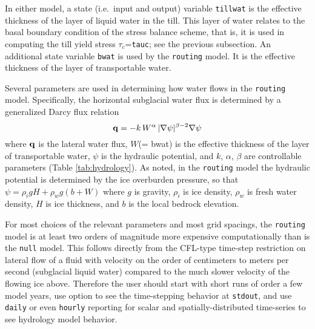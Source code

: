 In either model, a state (i.e.~input and output) variable \texttt{tillwat} is the effective thickness of the layer of liquid water in the till.  This layer of water relates to the basal boundary condition of the stress balance scheme, that is, it is used in computing the till yield stress $\tau_c$=\texttt{tauc}; see the previous subsection.  An additional state variable \texttt{bwat} is used by the  \texttt{routing} model.  It is the effective thickness of the layer of transportable water.

Several parameters are used in determining how water flows in the \texttt{routing} model.  Specifically, the horizontal subglacial water flux is determined by a generalized Darcy flux relation \cite{Clarke05,Schoofetal2012}
\begin{equation}  \label{eq:flux}
\mathbf{q} = - k\, W^\alpha\, |\nabla \psi|^{\beta-2} \nabla \psi
\end{equation}
where $\mathbf{q}$ is the lateral water flux, $W$(= bwat) is the effective thickness of the layer of transportable water, $\psi$ is the hydraulic potential, and $k$, $\alpha$, $\beta$ are controllable parameters (Table \ref{tab:hydrology}).  As noted, in the \texttt{routing} model the hydraulic potential is determined by the ice overburden pressure, so that $\psi = \rho_i g H + \rho_w g (b + W)$ where $g$ is gravity, $\rho_i$ is ice density, $\rho_w$ is fresh water density, $H$ is ice thickness, and $b$ is the local bedrock elevation.

For most choices of the relevant parameters and most grid spacings, the \texttt{routing} model is at least two orders of magnitude more expensive computationally than is the \texttt{null} model.  This follows directly from the CFL-type time-step restriction on lateral flow of a fluid with velocity on the order of centimeters to meters per second  (subglacial liquid water) compared to the much slower velocity of the flowing ice above.  Therefore the user should start with short runs of order a few model years, use option  to see the time-stepping behavior at \texttt{stdout}, and use \texttt{daily} or even \texttt{hourly} reporting for scalar and spatially-distributed time-series to see hydrology model behavior.
 


